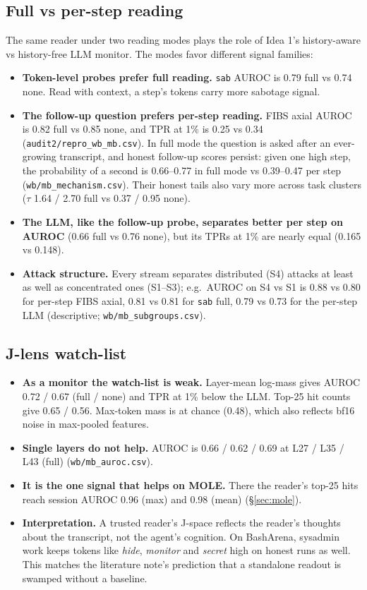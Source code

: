 \documentclass[11pt]{article}
\begin{document}
\subsection{Full vs per-step reading}
The same reader under two reading modes plays the role of Idea 1's history-aware vs history-free LLM monitor. The modes favor different signal families:
\begin{itemize}
\item \textbf{Token-level probes prefer full reading.} \texttt{sab} AUROC is 0.79 full vs 0.74 none. Read with context, a step's tokens carry more sabotage signal.
\item \textbf{The follow-up question prefers per-step reading.} FIBS axial AUROC is 0.82 full vs 0.85 none, and TPR at 1\% is 0.25 vs 0.34 (\nolinkurl{audit2/repro_wb_mb.csv}). In full mode the question is asked after an ever-growing transcript, and honest follow-up scores persist: given one high step, the probability of a second is 0.66--0.77 in full mode vs 0.39--0.47 per step (\nolinkurl{wb/mb_mechanism.csv}). Their honest tails also vary more across task clusters ($\tau$ 1.64 / 2.70 full vs 0.37 / 0.95 none).
\item \textbf{The LLM, like the follow-up probe, separates better per step on AUROC} (0.66 full vs 0.76 none), but its TPRs at 1\% are nearly equal (0.165 vs 0.148).
\item \textbf{Attack structure.} Every stream separates distributed (S4) attacks at least as well as concentrated ones (S1--S3); e.g.\ AUROC on S4 vs S1 is 0.88 vs 0.80 for per-step FIBS axial, 0.81 vs 0.81 for \texttt{sab} full, 0.79 vs 0.73 for the per-step LLM (descriptive; \nolinkurl{wb/mb_subgroups.csv}).
\end{itemize}


\subsection{J-lens watch-list}
\begin{itemize}
\item \textbf{As a monitor the watch-list is weak.} Layer-mean log-mass gives AUROC 0.72 / 0.67 (full / none) and TPR at 1\% below the LLM. Top-25 hit counts give 0.65 / 0.56. Max-token mass is at chance (0.48), which also reflects bf16 noise in max-pooled features.
\item \textbf{Single layers do not help.} AUROC is 0.66 / 0.62 / 0.69 at L27 / L35 / L43 (full) (\nolinkurl{wb/mb_auroc.csv}).
\item \textbf{It is the one signal that helps on MOLE.} There the reader's top-25 hits reach session AUROC 0.96 (max) and 0.98 (mean) (\S\ref{sec:mole}).
\item \textbf{Interpretation.} A trusted reader's J-space reflects the reader's thoughts about the transcript, not the agent's cognition. On BashArena, sysadmin work keeps tokens like \emph{hide}, \emph{monitor} and \emph{secret} high on honest runs as well. This matches the literature note's prediction that a standalone readout is swamped without a baseline.
\end{itemize}
\end{document}
